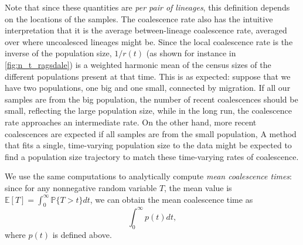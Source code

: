 \documentclass[12pt,halfline,a4paper]{ouparticle}
\begin{document}
Note that since these quantities are \emph{per pair of lineages},
this definition depends on the locations of the samples.
The coalescence rate also has the intuitive interpretation that
it is the average between-lineage coalescence rate,
averaged over where uncoalesced lineages might be.
Since the local coalescence rate is the inverse of the population size,
$1/r(t)$ (as shown for instance in \autoref{fig:n_t_ragsdale})
is a weighted harmonic mean of the census sizes of the different populations present at that time.
This is as expected: suppose that we have two populations, one big and one small,
connected by migration.
If all our samples are from the big population,
the number of recent coalescences should be small, reflecting the large population size,
while in the long run, the coalescence rate approaches an intermediate rate.
On the other hand, more recent coalescences are expected
if all samples are from the small population,
A method that fits a single, time-varying population size to the data
might be expected to find a population size trajectory
to match these time-varying rates of coalescence.

We use the same computations to analytically compute \emph{mean coalescence times}:
since for any nonnegative random variable $T$, the mean value is
$\mathbb{E}[T] = \int_0^\infty \mathbb{P}\{T > t\} dt$,
we can obtain the mean coalescence time as
$$
\int_0^\infty p(t) dt ,
$$
where $p(t)$ is defined above.
\end{document}
